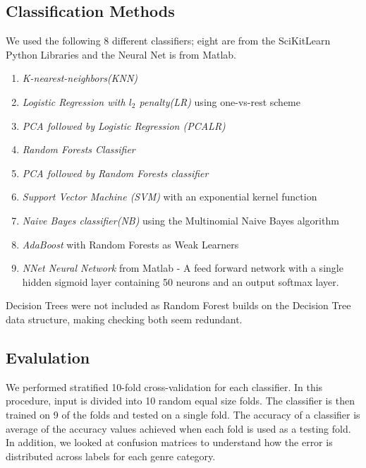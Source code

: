 \documentclass{article} %
\begin{document}
\subsection{Classification Methods}
We used the following 8 different classifiers; eight are from the SciKitLearn Python Libraries and the Neural Net is from Matlab. 
\begin{enumerate}
    \item \textit{K-nearest-neighbors(KNN)} 
    \item \textit{Logistic Regression with $l_2$ penalty(LR)} using one-vs-rest scheme 
    \item \textit{PCA followed by Logistic Regression (PCALR)}
    \item \textit{Random Forests Classifier}
    \item \textit{PCA followed by Random Forests classifier}
    \item \textit{Support Vector Machine (SVM)} with an exponential kernel function
    \item \textit{Naive Bayes classifier(NB)} using the Multinomial Naive Bayes algorithm
    \item \textit{AdaBoost} with Random Forests as Weak Learners
    \item \textit{NNet Neural Network} from Matlab - A feed forward network with a single hidden sigmoid layer containing 50 neurons and an output softmax layer.
\end{enumerate}
Decision Trees were not included as Random Forest builds on the Decision Tree data structure, making checking both seem  redundant.
\subsection{Evalulation}
We performed stratified 10-fold cross-validation for each classifier. In this procedure, input is divided into 10 random equal size folds. The classifier is then trained on 9 of the folds and tested on a single fold. The accuracy of a classifier is average of the accuracy values achieved when each fold is used as a testing fold. In addition, we looked at confusion matrices to understand how the error is distributed across labels for each genre category.
\end{document}
